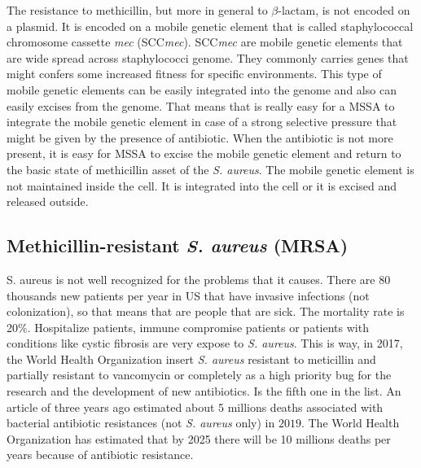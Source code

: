 The resistance to methicillin, but more in general to $\beta$-lactam, is not encoded on a plasmid. It is encoded on a mobile genetic element that is called staphylococcal chromosome cassette \emph{mec} (SCC\emph{mec}). SCC\emph{mec} are mobile genetic elements that are wide spread across staphylococci genome. They commonly carries genes that might confers some increased fitness for specific environments. This type of mobile genetic elements can be easily integrated into the genome and also can easily excises from the genome. That means that is really easy for a MSSA to integrate the mobile genetic element in case of a strong selective pressure that might be given by the presence of antibiotic. When the antibiotic is not more present, it is easy for MSSA to excise the mobile genetic element and return to the basic state of methicillin asset of the \emph{S. aureus}. 
The mobile genetic element is not maintained inside the cell. It is integrated into the cell or it is excised and released outside.

\subsection{Methicillin-resistant \emph{S. aureus} (MRSA)}
S. aureus is not well recognized for the problems that it causes. There are 80 thousands new patients per year in US that have invasive infections (not colonization), so that means that are people that are sick. The mortality rate is 20$\%$. 
Hospitalize patients, immune compromise patients or patients with conditions like cystic fibrosis are very expose to \emph{S. aureus}. This is way, in 2017, the World Health Organization insert \emph{S. aureus} resistant to meticillin and partially resistant to vancomycin or completely as a high priority bug for the research and the development of new antibiotics. Is the fifth one in the list.
An article of three years ago estimated about 5 millions deaths associated with bacterial antibiotic resistances (not \emph{S. aureus} only) in $2019$. The World Health Organization has estimated that by 2025 there will be 10 millions deaths per years because of antibiotic resistance. 

